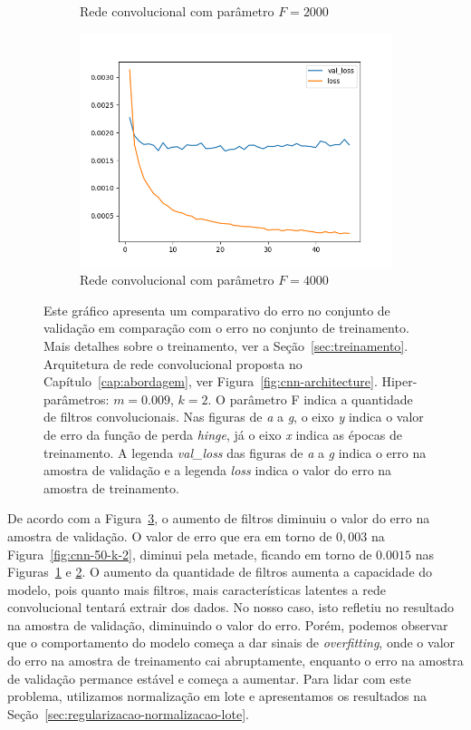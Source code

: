 \begin{figure}[p]
\begin{subfigure}{.5\textwidth}
  \caption{Rede convolucional com parâmetro $F = 2000$}
  \label{fig:cnn-2000-k-2}
\end{subfigure}
\begin{subfigure}{.5\textwidth}
  \centering
  \includegraphics[width=.8\linewidth]{figuras/ape-ajustes-hiper-parametros/cnn-4000-k-2.png}
  \caption{Rede convolucional com parâmetro $F = 4000$}
  \label{fig:cnn-4000-k-2}
\end{subfigure}
\caption{Este gráfico apresenta um comparativo do erro no conjunto de validação em comparação com o erro no conjunto de treinamento. Mais detalhes sobre o treinamento, ver a Seção~\ref{sec:treinamento}. Arquitetura de rede convolucional proposta no Capítulo~\ref{cap:abordagem}, ver Figura~\ref{fig:cnn-architecture}. Hiper-parâmetros: $m = 0.009$, $k = 2$. O parâmetro F indica a quantidade de filtros convolucionais. Nas figuras de \emph{a} a \emph{g}, o eixo \emph{y} indica o valor de erro da função de perda \textit{hinge}, já o eixo \emph{x} indica as épocas de treinamento. A legenda \emph{val\_loss} das figuras de \emph{a} a \emph{g} indica o erro na amostra de validação e a legenda \emph{loss} indica o valor do erro na amostra de treinamento. }
\label{fig:treinamento-cnn-k-2-m-0009}
\end{figure}

De acordo com a Figura~\ref{fig:treinamento-cnn-k-2-m-0009}, o aumento de filtros diminuiu o valor do erro na amostra de validação. O valor de erro que era em torno de $0,003$ na Figura~\ref{fig:cnn-50-k-2}, diminui pela metade, ficando em torno de $0.0015$ nas Figuras~\ref{fig:cnn-2000-k-2} e \ref{fig:cnn-4000-k-2}. O aumento da quantidade de filtros aumenta a capacidade do modelo, pois quanto mais filtros, mais características latentes a rede convolucional tentará extrair dos dados. No nosso caso, isto refletiu no resultado na amostra de validação, diminuindo o valor do erro. Porém, podemos observar que o comportamento do modelo começa a dar sinais de \textit{overfitting}, onde o valor do erro na amostra de treinamento cai abruptamente, enquanto o erro na amostra de validação permance estável e começa a aumentar. Para lidar com este problema, utilizamos normalização em lote e apresentamos os resultados na Seção~\ref{sec:regularizacao-normalizacao-lote}. 

